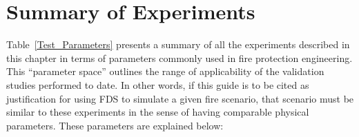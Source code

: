 \FloatBarrier







\section{Summary of Experiments}

\label{experiment_summary}

Table~\ref{Test_Parameters} presents a summary of all the experiments described in this chapter in terms of parameters commonly used in fire protection engineering. This ``parameter space'' outlines the range of applicability of the validation studies performed to date. In other words, if this guide is to be cited as justification for using FDS to simulate a given fire scenario, that scenario must be similar to these experiments in the sense of having comparable physical parameters. These parameters are explained below:
